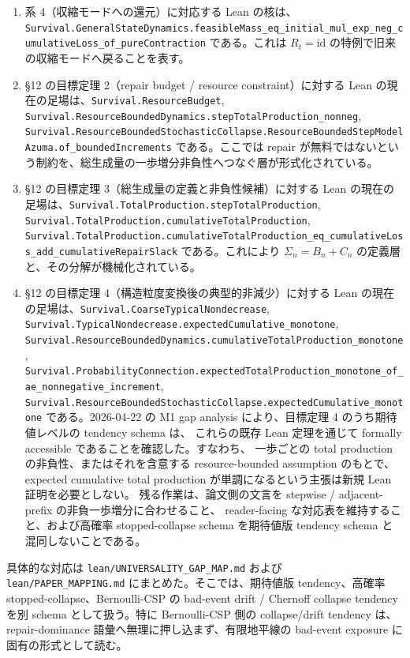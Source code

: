 \documentclass[12pt,a4paper]{article}
\begin{document}
\begin{enumerate}
\def\labelenumi{\arabic{enumi}.}
\setcounter{enumi}{3}
\item
  系 4（収縮モードへの還元）に対応する Lean の核は、\texttt{Survival.GeneralStateDynamics.feasibleMass\_eq\_initial\_mul\_exp\_neg\_cumulativeLoss\_of\_pureContraction} である。これは \(R_{t} = \mathrm{id}\) の特例で旧来の収縮モードへ戻ることを表す。
\item
  §12 の目標定理 2（repair budget / resource constraint）に対する Lean の現在の足場は、\texttt{Survival.ResourceBudget}, \texttt{Survival.ResourceBoundedDynamics.stepTotalProduction\_nonneg}, \texttt{Survival.ResourceBoundedStochasticCollapse.ResourceBoundedStepModelAzuma.of\_boundedIncrements} である。ここでは repair が無料ではないという制約を、総生成量の一歩増分非負性へつなぐ層が形式化されている。
\item
  §12 の目標定理 3（総生成量の定義と非負性候補）に対する Lean の現在の足場は、\texttt{Survival.TotalProduction.stepTotalProduction}, \texttt{Survival.TotalProduction.cumulativeTotalProduction}, \texttt{Survival.TotalProduction.cumulativeTotalProduction\_eq\_cumulativeLoss\_add\_cumulativeRepairSlack} である。これにより \(\Sigma_{n} = B_{n} + C_{n}\) の定義層と、その分解が機械化されている。
\item
  §12 の目標定理 4（構造粒度変換後の典型的非減少）に対する Lean の現在の足場は、\texttt{Survival.CoarseTypicalNondecrease}, \texttt{Survival.TypicalNondecrease.expectedCumulative\_monotone}, \texttt{Survival.ResourceBoundedDynamics.cumulativeTotalProduction\_monotone}, \texttt{Survival.ProbabilityConnection.expectedTotalProduction\_monotone\_of\_ae\_nonnegative\_increment}, \texttt{Survival.ResourceBoundedStochasticCollapse.expectedCumulative\_monotone} である。2026-04-22 の M1 gap analysis により、目標定理 4 のうち期待値レベルの tendency schema は、 これらの既存 Lean 定理を通じて formally accessible であることを確認した。すなわち、 一歩ごとの total production の非負性、またはそれを含意する resource-bounded assumption のもとで、 expected cumulative total production が単調になるという主張は新規 Lean 証明を必要としない。 残る作業は、論文側の文言を stepwise / adjacent-prefix の非負一歩増分に合わせること、 reader-facing な対応表を維持すること、および高確率 stopped-collapse schema を期待値版 tendency schema と混同しないことである。
\end{enumerate}

具体的な対応は \texttt{lean/UNIVERSALITY\_GAP\_MAP.md} および \texttt{lean/PAPER\_MAPPING.md} にまとめた。そこでは、期待値版 tendency、高確率 stopped-collapse、Bernoulli-CSP の bad-event drift / Chernoff collapse tendency を別 schema として扱う。特に Bernoulli-CSP 側の collapse/drift tendency は、repair-dominance 語彙へ無理に押し込まず、有限地平線の bad-event exposure に固有の形式として読む。
\end{document}
